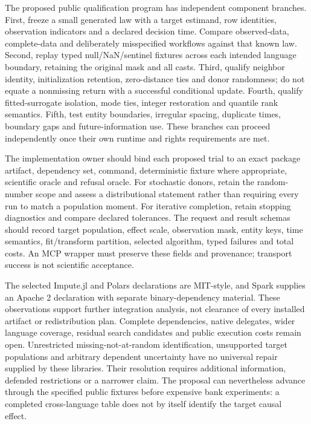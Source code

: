 The proposed public qualification program has independent component branches. First, freeze a small generated law with a target estimand, row identities, observation indicators and a declared decision time. Compare observed-data, complete-data and deliberately misspecified workflows against that known law. Second, replay typed null/NaN/sentinel fixtures across each intended language boundary, retaining the original mask and all casts. Third, qualify neighbor identity, initialization retention, zero-distance ties and donor randomness; do not equate a nonmissing return with a successful conditional update. Fourth, qualify fitted-surrogate isolation, mode ties, integer restoration and quantile rank semantics. Fifth, test entity boundaries, irregular spacing, duplicate times, boundary gaps and future-information use. These branches can proceed independently once their own runtime and rights requirements are met.~\citep{exec25_otm_choice}

The implementation owner should bind each proposed trial to an exact package artifact, dependency set, command, deterministic fixture where appropriate, scientific oracle and refusal oracle. For stochastic donors, retain the random-number scope and assess a distributional statement rather than requiring every run to match a population moment. For iterative completion, retain stopping diagnostics and compare declared tolerances. The request and result schemas should record target population, effect scale, observation mask, entity keys, time semantics, fit/transform partition, selected algorithm, typed failures and total costs. An MCP wrapper must preserve these fields and provenance; transport success is not scientific acceptance.~\citep{exec25_otm_choice}

The selected Impute.jl and Polars declarations are MIT-style, and Spark supplies an Apache 2 declaration with separate binary-dependency material. These observations support further integration analysis, not clearance of every installed artifact or redistribution plan. Complete dependencies, native delegates, wider language coverage, residual search candidates and public execution costs remain open. Unrestricted missing-not-at-random identification, unsupported target populations and arbitrary dependent uncertainty have no universal repair supplied by these libraries. Their resolution requires additional information, defended restrictions or a narrower claim. The proposal can nevertheless advance through the specified public fixtures before expensive bank experiments: a completed cross-language table does not by itself identify the target causal effect.~\citep{exec25_otm_imputejl,exec25_otm_spark,exec25_otm_polars,exec25_otm_choice}


